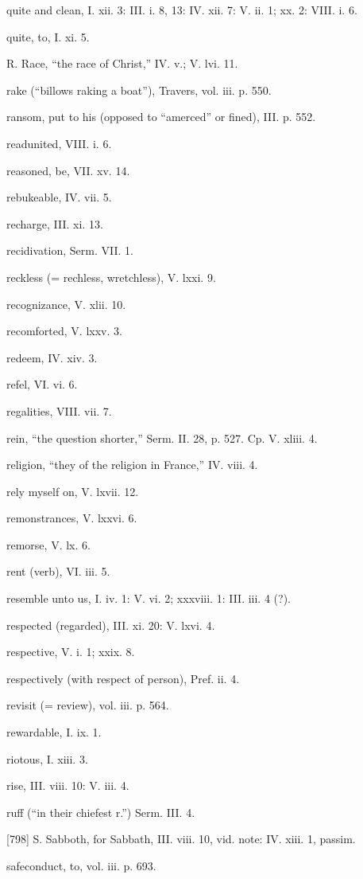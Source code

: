 quite and clean, I. xii. 3: III. i. 8, 13: IV. xii. 7: V. ii. 1; xx. 2: VIII. i. 6.

quite, to, I. xi. 5.

R.
Race, “the race of Christ,” IV. v.; V. lvi. 11.

rake (“billows raking a boat”), Travers, vol. iii. p. 550.

ransom, put to his (opposed to “amerced” or fined), III. p. 552.

readunited, VIII. i. 6.

reasoned, be, VII. xv. 14.

rebukeable, IV. vii. 5.

recharge, III. xi. 13.

recidivation, Serm. VII. 1.

reckless (= rechless, wretchless), V. lxxi. 9.

recognizance, V. xlii. 10.

recomforted, V. lxxv. 3.

redeem, IV. xiv. 3.

refel, VI. vi. 6.

regalities, VIII. vii. 7.

rein, “the question shorter,” Serm. II. 28, p. 527. Cp. V. xliii. 4.

religion, “they of the religion in France,” IV. viii. 4.

rely myself on, V. lxvii. 12.

remonstrances, V. lxxvi. 6.

remorse, V. lx. 6.

rent (verb), VI. iii. 5.

resemble unto us, I. iv. 1: V. vi. 2; xxxviii. 1: III. iii. 4 (?).

respected (regarded), III. xi. 20: V. lxvi. 4.

respective, V. i. 1; xxix. 8.

respectively (with respect of person), Pref. ii. 4.

revisit (= review), vol. iii. p. 564.

rewardable, I. ix. 1.

riotous, I. xiii. 3.

rise, III. viii. 10: V. iii. 4.

ruff (“in their chiefest r.”) Serm. III. 4.

[798]
S.
Sabboth, for Sabbath, III. viii. 10, vid. note: IV. xiii. 1, passim.

safeconduct, to, vol. iii. p. 693.

